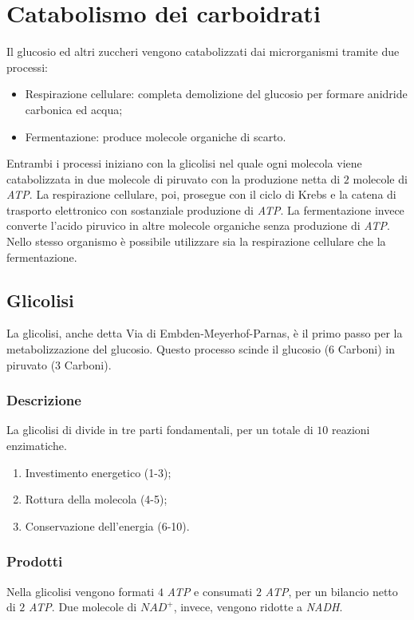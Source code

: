 \section{Catabolismo dei carboidrati}
Il glucosio ed altri zuccheri vengono catabolizzati dai microrganismi tramite due processi: 
\begin{multicols}{2}
	\begin{itemize}
    		\item Respirazione cellulare: completa demolizione del glucosio per formare anidride carbonica ed acqua;
    		\item Fermentazione: produce molecole organiche di scarto.
	\end{itemize}
\end{multicols}
Entrambi i processi iniziano con la glicolisi nel quale ogni molecola viene catabolizzata in due molecole di piruvato con la produzione netta di $2$ molecole di \emph{ATP}.
La respirazione cellulare, poi, prosegue con il ciclo di Krebs e la catena di trasporto elettronico con sostanziale produzione di \emph{ATP}.
La fermentazione invece converte l'acido piruvico in altre molecole organiche senza produzione di \emph{ATP}. 
Nello stesso organismo \`e possibile utilizzare sia la respirazione cellulare che la fermentazione.

		\subsection{Glicolisi}
		La glicolisi, anche detta Via di Embden-Meyerhof-Parnas, \`e il primo passo per la metabolizzazione del glucosio. 
		Questo processo scinde il glucosio (6 Carboni) in piruvato (3 Carboni).

			\subsubsection{Descrizione}
			La glicolisi di divide in tre parti fondamentali, per un totale di $10$ reazioni enzimatiche.
			\begin{enumerate}
			    \item Investimento energetico (1-3);
			    \item Rottura della molecola (4-5);
			    \item Conservazione dell'energia (6-10).
			\end{enumerate}

			\subsubsection{Prodotti}
			Nella glicolisi vengono formati $4$ \emph{ATP} e consumati $2$ \emph{ATP}, per un bilancio netto di $2$ \emph{ATP}. 
			Due molecole di \emph{$NAD^{+}$}, invece, vengono ridotte a \emph{NADH}.

